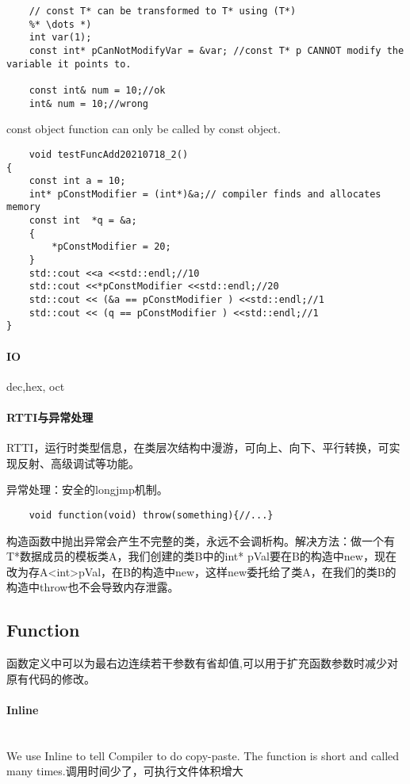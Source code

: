 \documentclass[UTF8]{../computerUniverse}
\begin{document}
\begin{lstlisting}
    // const T* can be transformed to T* using (T*)
    %* \dots *)
    int var(1);
    const int* pCanNotModifyVar = &var; //const T* p CANNOT modify the variable it points to.

    const int& num = 10;//ok
    int& num = 10;//wrong
\end{lstlisting}
const object function can only be called by const object.\\

\begin{lstlisting}
    void testFuncAdd20210718_2()
{
    const int a = 10;
	int* pConstModifier = (int*)&a;// compiler finds and allocates memory
	const int  *q = &a;
	{
		*pConstModifier = 20;
	}
	std::cout <<a <<std::endl;//10
	std::cout <<*pConstModifier <<std::endl;//20
	std::cout << (&a == pConstModifier ) <<std::endl;//1
	std::cout << (q == pConstModifier ) <<std::endl;//1
}
\end{lstlisting}



\paragraph{IO}

dec,hex, oct

\paragraph{RTTI与异常处理}
RTTI，运行时类型信息，在类层次结构中漫游，可向上、向下、平行转换，可实现反射、高级调试等功能。

异常处理：安全的longjmp机制。
\begin{lstlisting}
    void function(void) throw(something){//...}
\end{lstlisting}
构造函数中抛出异常会产生不完整的类，永远不会调析构。解决方法：做一个有T*数据成员的模板类A，我们创建的类B中的int* pVal要在B的构造中new，现在改为存A<int>pVal，在B的构造中new，这样new委托给了类A，在我们的类B的构造中throw也不会导致内存泄露。



\subsection{Function}
函数定义中可以为最右边连续若干参数有省却值,可以用于扩充函数参数时减少对原有代码的修改。
\paragraph{Inline} \quad\\
We use Inline to tell Compiler to do copy-paste. The function is short and called many times.调用时间少了，可执行文件体积增大
\end{document}
